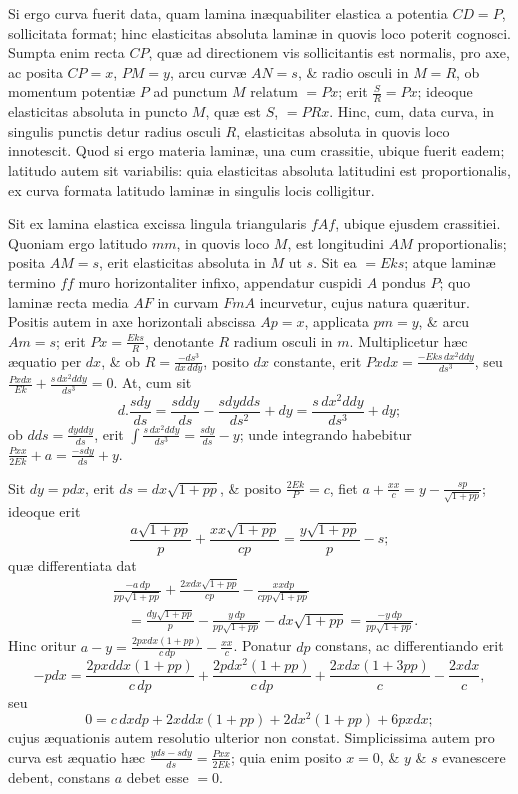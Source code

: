 Si ergo curva fuerit data, quam lamina inæquabiliter elastica a potentia $CD=P$, sollicitata format; hinc elasticitas absoluta laminæ in quovis loco poterit cognosci. Sumpta enim recta $CP$, quæ ad directionem vis sollicitantis est normalis, pro axe, ac posita $CP=x$, $PM=y$, arcu curvæ $AN=s$, \& radio osculi in $M=R$, ob momentum potentiæ $P$ ad punctum $M$ relatum $=Px$; erit $\frac SR=Px$; ideoque elasticitas absoluta in puncto $M$, quæ est $S$, $=PRx$. Hinc,
cum, data curva, in singulis punctis detur radius osculi $R$, elasticitas absoluta in quovis loco innotescit. Quod si ergo materia laminæ, una cum crassitie, ubique fuerit eadem; latitudo autem sit variabilis: quia elasticitas absoluta latitudini est proportionalis, ex curva formata latitudo laminæ in singulis locis colligitur.

Sit ex lamina elastica excissa lingula triangularis $fAf$, ubique ejusdem crassitiei. Quoniam ergo latitudo $mm$, in quovis loco $M$, est longitudini $AM$ proportionalis; posita $AM=s$, erit elasticitas absoluta in $M$ ut $s$. Sit ea $=Eks$; atque laminæ termino $ff$ muro horizontaliter infixo, appendatur cuspidi $A$ pondus $P$; quo laminæ recta media $AF$ in curvam $FmA$ incurvetur, cujus natura quæritur. Positis autem in axe horizontali abscissa $Ap=x$, applicata $pm=y$, \& arcu $Am=s$; erit $Px=\frac{Eks}R$, denotante $R$ radium osculi in $m$. Multiplicetur hæc æquatio per $dx$, \& ob $R=\frac{-ds^3}{dx\,ddy}$, posito $dx$ constante, erit $Pxdx=\frac{-Eks\,dx^2ddy}{ds^3}$, seu $\frac{Pxdx}{Ek}+\frac{s\,dx^2ddy}{ds^3}=0$. At, cum sit
\[d.\frac{sdy}{ds}=\frac{sddy}{ds}-\frac{sdydds}{ds^2}+dy=\frac{s\,dx^2ddy}{ds^3}+dy;\]
ob $dds=\frac{dyddy}{ds}$, erit $\int\frac{s\,dx^2ddy}{ds^3}=\frac{sdy}{ds}-y$; unde integrando habebitur $\frac{Pxx}{2Ek}+a=\frac{-sdy}{ds}+y$.

Sit $dy=pdx$, erit $ds=dx\sqrt{1+pp}$, \& posito $\frac{2Ek}P=c$, fiet $a+\frac{xx}c=y-\frac{sp}{\sqrt{1+pp}}$; ideoque erit
\[\frac{a\sqrt{1+pp}}p+\frac{xx\sqrt{1+pp}}{cp}=\frac{y\sqrt{1+pp}}p-s;\]
quæ differentiata dat
\[\begin{aligned}
&\frac{-a\,dp}{pp\sqrt{1+pp}}+\frac{2xdx\sqrt{1+pp}}{cp}-\frac{xxdp}{cpp\sqrt{1+pp}}\\
&\quad=\frac{dy\sqrt{1+pp}}p-\frac{y\,dp}{pp\sqrt{1+pp}}-dx\sqrt{1+pp}=\frac{-y\,dp}{pp\sqrt{1+pp}}.
\end{aligned}\]
Hinc oritur $a-y=\frac{2pxdx(1+pp)}{c\,dp}-\frac{xx}c$. Ponatur $dp$ constans, ac differentiando erit
\[-pdx=\frac{2pxddx(1+pp)}{c\,dp}+\frac{2pdx^2(1+pp)}{c\,dp}+\frac{2xdx(1+3pp)}c-\frac{2xdx}c,\]
seu
\[0=c\,dxdp+2xddx(1+pp)+2dx^2(1+pp)+6pxdx;\]
cujus æquationis autem resolutio ulterior non constat. Simplicissima autem pro curva est æquatio hæc $\frac{yds-sdy}{ds}=\frac{Pxx}{2Ek}$; quia enim posito $x=0$, \& $y$ \& $s$ evanescere debent, constans $a$ debet esse $=0$.


